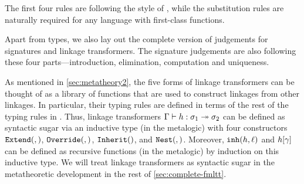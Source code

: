 The first four rules are following the style of \citet{program2013homotopy, pfenning2009lecture}, while the substitution rules are naturally required for any language with first-class functions.

Apart from types, we also lay out the complete version of judgements for signatures and linkage transformers. The signature judgements are also following these four parts---introduction, elimination, computation and uniqueness.










%

As mentioned in \cref{sec:metatheory2}, the five forms of linkage transformers can be
thought of as a library of functions that are used to construct linkages from other
linkages.
In particular, their typing rules are defined in terms of the rest of the typing
rules in \TT.
Thus, linkage transformers $ {\Gamma} \vdash {h} : {\sigma_1} \twoheadrightarrow {\ensuremath{\sigma}_2}$ can be defined
as syntactic sugar via an inductive type (in the meta\-logic) with four constructors
$\texttt{Extend}({},{})$, $\texttt{Override}({},{})$, $\texttt{Inherit}({})$, and $\texttt{Nest}({},{})$.
Moreover, $\texttt{inh}({h},{\ell})$ and ${h}\!\left[{\gamma}\right]$ can be defined
as recursive functions (in the meta\-logic) by induction on this inductive type.
We will treat linkage transformers as syntactic sugar in the meta\-theoretic development
in the rest of \cref{sec:complete-fmltt}.

